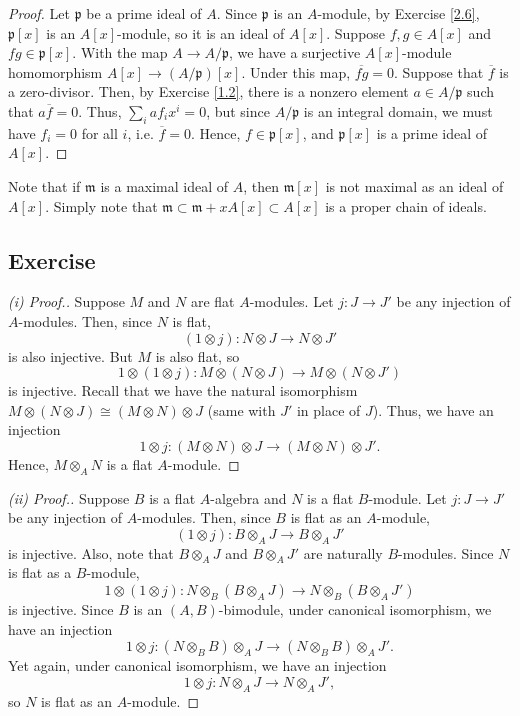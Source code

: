 \begin{proof}
Let $\mathfrak{p}$ be a prime ideal of $A$. Since $\mathfrak{p}$ is an $A$-module, by Exercise \ref{2.6}, $\mathfrak{p}[x]$ is an $A[x]$-module, so it is an ideal of $A[x]$. Suppose $f,g \in A[x]$ 
and $fg \in \mathfrak{p}[x]$. With the map $A \to A/\mathfrak{p}$, we have a surjective $A[x]$-module homomorphism $A[x] \to (A/\mathfrak{p})[x]$. Under this map, $\overline{fg} = 0$. Suppose that 
$\overline{f}$ is a zero-divisor. Then, by Exercise \ref{1.2}, there is a nonzero element $a \in A/\mathfrak{p}$ such that $a\overline{f} = 0$. Thus, $\sum_i af_i x^i = 0$, but since $A/\mathfrak{p}$ 
is an integral domain, we must have $f_i = 0$ for all $i$, i.e. $\overline{f} = 0$. Hence, $f \in \mathfrak{p}[x]$, and $\mathfrak{p}[x]$ is a prime ideal of $A[x]$.
\end{proof}

\begin{remark}
Note that if $\mathfrak{m}$ is a maximal ideal of $A$, then $\mathfrak{m}[x]$ is not maximal as an ideal of $A[x]$. Simply note that $\mathfrak{m} \subset \mathfrak{m} + xA[x] \subset A[x]$
is a proper chain of ideals.
\end{remark}

\subsection{Exercise}\label{2.8} %

\begin{proof}[(i) Proof.]
Suppose $M$ and $N$ are flat $A$-modules. Let $j : J \to J'$ be any injection of $A$-modules. Then, since $N$ is flat,
$$(1 \otimes j) : N \otimes J \to N \otimes J'$$
is also injective. But $M$ is also flat, so
$$1 \otimes (1 \otimes j) : M \otimes (N \otimes J) \to M \otimes (N \otimes J')$$
is injective. Recall that we have the natural isomorphism $M \otimes (N \otimes J) \cong (M \otimes N) \otimes J$ (same with $J'$ in place of $J$). Thus, we have an injection
$$1 \otimes j : (M \otimes N) \otimes J \to (M \otimes N) \otimes J'.$$
Hence, $M \otimes_A N$ is a flat $A$-module.
\end{proof}

\begin{proof}[(ii) Proof.]
Suppose $B$ is a flat $A$-algebra and $N$ is a flat $B$-module. Let $j : J \to J'$ be any injection of $A$-modules. Then, since $B$ is flat as an $A$-module,
$$(1 \otimes j) : B \otimes_A J \to B \otimes_A J'$$
is injective. Also, note that $B \otimes_A J$ and $B \otimes_A J'$ are naturally $B$-modules. Since $N$ is flat as a $B$-module,
$$1 \otimes (1 \otimes j) : N \otimes_B (B \otimes_A J) \to N \otimes_B (B \otimes_A J')$$
is injective. Since $B$ is an $(A,B)$-bimodule, under canonical isomorphism, we have an injection
$$1 \otimes j : (N \otimes_B B) \otimes_A J \to (N \otimes_B B) \otimes_A J'.$$
Yet again, under canonical isomorphism, we have an injection
$$1 \otimes j : N \otimes_A J \to N \otimes_A J',$$
so $N$ is flat as an $A$-module.
\end{proof}

